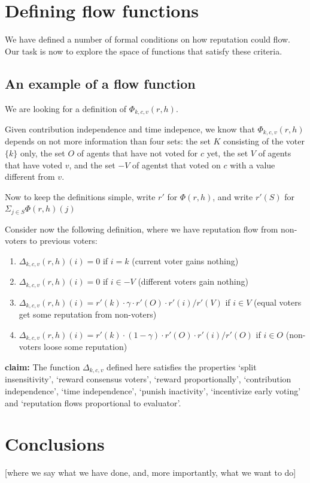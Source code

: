 \documentclass{article}
\newcommand{\flow}{\Phi}
\begin{document}
\section{Defining flow functions}

We have defined a number of formal conditions on how reputation could flow. Our task is now to explore the space of functions that satisfy these criteria.

\subsection{An example of a flow function}


We are looking for a definition of $\Phi_{k,c,v}(r, h)$.

Given contribution independence and time indepence, we know that  $\Phi_{k,c,v}(r, h)$ depends on not more information than four sets: the set $K$ consisting of the voter $\{k\}$ only, the set $O$ of agents that have not voted for $c$ yet, the set $V$ of agents that have voted $v$, and the set $-V$ of agentst that voted on $c$ with a value different from $v$.

Now to keep the definitions simple, write $r'$ for $\flow(r, h)$, and write $r'(S)$ for $\Sigma_{j\in S}\flow(r, h)(j)$

Consider now the following definition, where we have reputation flow from non-voters to previous voters:

\begin{enumerate}
\item $\Delta_{k,c,v}(r,h)(i) = 0$ if $i=k$ (current voter gains nothing)
\item $\Delta_{k,c,v}(r,h)(i) = 0$ if $i \in -V$ (different voters gain nothing)
\item $\Delta_{k,c,v}(r,h)(i) = r'(k) \cdot \gamma \cdot r'(O) \cdot r'(i) / r'(V)$ 
if $i \in V$ (equal voters get some reputation from non-voters)
\item $\Delta_{k,c,v}(r,h)(i) = r'(k) \cdot (1-\gamma) \cdot
r'(O)
\cdot r'(i) / 
r'(O) $ if $i \in O$ (non-voters loose some reputation)
\end{enumerate}
{\bf claim:} The function $\Delta_{k, c, v}$ defined here satisfies the properties `split insensitivity', `reward consensus voters', `reward proportionally', `contribution independence',  `time independence',  `punish inactivity', `incentivize early voting' and `reputation flows proportional to evaluator'.


\section{Conclusions}
[where we say what we have done, and, more importantly, what we want to do]
\end{document}
